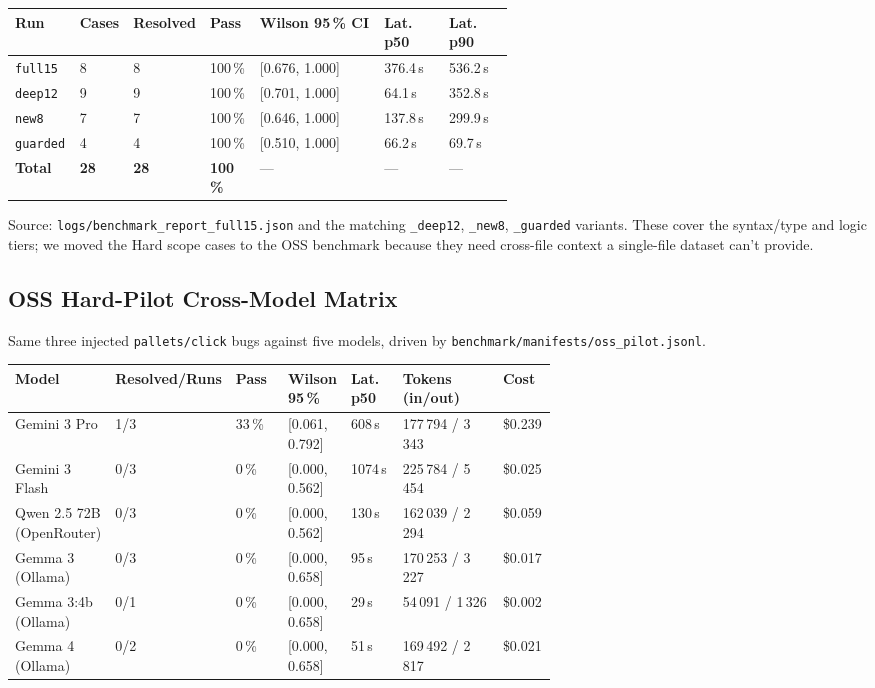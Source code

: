 \documentclass[11pt,letterpaper]{article}
\begin{document}
\begin{tabularx}{\linewidth}{l R{0.10\linewidth} R{0.12\linewidth} R{0.10\linewidth} l R{0.13\linewidth} R{0.13\linewidth}}
\toprule
\textbf{Run} & \textbf{Cases} & \textbf{Resolved} & \textbf{Pass} & \textbf{Wilson 95\,\% CI} & \textbf{Lat. p50} & \textbf{Lat. p90} \\
\midrule
\texttt{full15}  & 8 & 8 & 100\,\% & [0.676, 1.000] & 376.4\,s & 536.2\,s \\
\texttt{deep12}  & 9 & 9 & 100\,\% & [0.701, 1.000] &  64.1\,s & 352.8\,s \\
\texttt{new8}    & 7 & 7 & 100\,\% & [0.646, 1.000] & 137.8\,s & 299.9\,s \\
\texttt{guarded} & 4 & 4 & 100\,\% & [0.510, 1.000] &  66.2\,s &  69.7\,s \\
\midrule
\textbf{Total}   & \textbf{28} & \textbf{28} & \textbf{100\,\%} & --- & --- & --- \\
\bottomrule
\end{tabularx}

Source: \texttt{logs/benchmark\_report\_full15.json} and the matching \texttt{\_deep12}, \texttt{\_new8}, \texttt{\_guarded} variants. These cover the syntax/type and logic tiers; we moved the Hard scope cases to the OSS benchmark because they need cross-file context a single-file dataset can't provide.

\subsection{OSS Hard-Pilot Cross-Model Matrix}

Same three injected \texttt{pallets/click} bugs against five models, driven by \texttt{benchmark/manifests/oss\_pilot.jsonl}.

\begin{tabularx}{\linewidth}{l R{0.13\linewidth} R{0.10\linewidth} l R{0.10\linewidth} R{0.20\linewidth} R{0.10\linewidth}}
\toprule
\textbf{Model} & \textbf{Resolved/Runs} & \textbf{Pass} & \textbf{Wilson 95\,\%} & \textbf{Lat. p50} & \textbf{Tokens (in/out)} & \textbf{Cost} \\
\midrule
Gemini 3 Pro                  & 1/3 & 33\,\% & [0.061, 0.792] &  608\,s & 177\,794 / 3\,343 & \$0.239 \\
Gemini 3 Flash                & 0/3 &  0\,\% & [0.000, 0.562] & 1074\,s & 225\,784 / 5\,454 & \$0.025 \\
Qwen 2.5 72B (OpenRouter)     & 0/3 &  0\,\% & [0.000, 0.562] &  130\,s & 162\,039 / 2\,294 & \$0.059 \\
Gemma 3 (Ollama)              & 0/3 &  0\,\% & [0.000, 0.658] &   95\,s & 170\,253 / 3\,227 & \$0.017 \\
Gemma 3:4b (Ollama)           & 0/1 &  0\,\% & [0.000, 0.658] &   29\,s &  54\,091 / 1\,326 & \$0.002 \\
Gemma 4 (Ollama)              & 0/2 &  0\,\% & [0.000, 0.658] &   51\,s & 169\,492 / 2\,817 & \$0.021 \\
\bottomrule
\end{tabularx}
\end{document}
